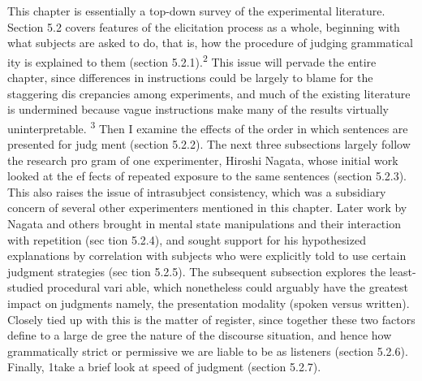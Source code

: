 \begin{styleTextbody}
This chapter is essentially a top-down survey of the experimental literature. Section 5.2 covers features of the elicitation process as a whole, beginning with what subjects are asked to do, that is, how the procedure of judging grammatical\- ity is explained to them (section 5.2.1).\textsuperscript{2 }This issue will pervade the entire chapter, since differences in instructions could be largely to blame for the staggering dis\- crepancies among experiments, and much of the existing literature is undermined because vague instructions make many of the results virtually uninterpretable. \textsuperscript{3}\textsuperscript{ }Then I examine the effects of the order in which sentences are presented for judg\- ment (section 5.2.2). The next three subsections largely follow the research pro\- gram of one experimenter, Hiroshi Nagata, whose initial work looked at the ef\- fects of repeated exposure to the same sentences (section 5.2.3). This also raises the issue of intrasubject consistency, which was a subsidiary concern of several other experimenters mentioned in this chapter. Later work by Nagata and others brought in mental state manipulations and their interaction with repetition (sec\- tion 5.2.4), and sought support for his hypothesized explanations by correlation with subjects who were explicitly told to use certain judgment strategies (sec\- tion 5.2.5). The subsequent subsection explores the least-studied procedural vari\- able, which nonetheless could arguably have the greatest impact on judgments\- namely, the presentation modality (spoken versus written). Closely tied up with this is the matter of register, since together these two factors define to a large de\- gree the nature of the discourse situation, and hence how grammatically strict or permissive we are liable to be as listeners (section 5.2.6). Finally, 1take a brief look at speed of judgment (section 5.2.7).
\end{styleTextbody}


